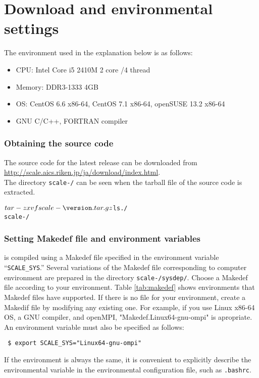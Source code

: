\section{Download and environmental settings} \label{sec:scale_compile}

The environment used in the explanation below is as follows:
\begin{itemize}
\item CPU: Intel Core i5 2410M 2 core /4 thread
\item Memory: DDR3-1333 4GB
\item OS: CentOS 6.6 x86-64, CentOS 7.1 x86-64, openSUSE 13.2 x86-64
\item GNU C/C++, FORTRAN compiler %
\end{itemize}

\subsubsection{Obtaining the source code} %
The source code for the latest release can be downloaded
from \url{http://scale.aics.riken.jp/ja/download/index.html}.\\
The directory \texttt{scale-{\version}/} can be seen when the tarball file of the source code is extracted.
\begin{alltt}
 $ tar -zxvf scale-{\version}.tar.gz
 $ ls ./
    scale-{\version}/
\end{alltt}

\subsubsection{Setting Makedef file and environment variables} \label{subsec:environment}

\scalelib is compiled using a Makedef file
specified in the environment variable ``\verb|SCALE_SYS|.''
Several variations of the Makedef file corresponding to computer environment are prepared in the directory \texttt{scale-{\version}/sysdep/}.
Choose a Makedef file according to your environment.
Table \ref{tab:makedef} shows environments that Makedef files have supported. If there is no file for your environment, create a Makedif file by modifying any existing one.
For example,
if you use Linux x86-64 OS, a GNU compiler, and openMPI,
"Makedef.Linux64-gnu-ompi" is apropriate.
An environment variable must also be specified as follows:
\begin{verbatim}
 $ export SCALE_SYS="Linux64-gnu-ompi"
\end{verbatim}
If the environment is always the same, it is convenient to explicitly describe the environmental variable in the environmental configuration file, such as \verb|.bashrc|.

